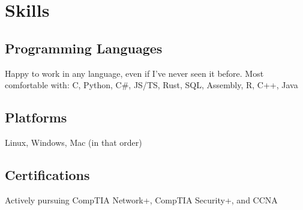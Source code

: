 \documentclass[11pt]{article}
\begin{document}
\section{Skills}
\label{sec:org466ae48}
\subsection{Programming Languages}
\label{sec:org7fba5ee}
Happy to work in any language, even if I've never seen it before.
Most comfortable with: C, Python, C\#, JS/TS, Rust, SQL, Assembly, R, C++, Java
\subsection{Platforms}
\label{sec:orga78fdfe}
Linux, Windows, Mac (in that order)
\subsection{Certifications}
\label{sec:org856fba5}
Actively pursuing CompTIA Network+, CompTIA Security+, and CCNA
\end{document}
